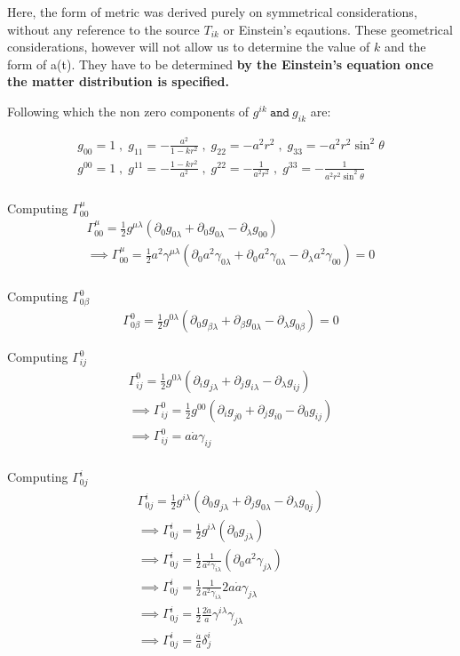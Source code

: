 \documentclass[12pt]{report}
\newcommand{\ch}[2]{\Gamma^{#1}_{#2}}
\newcommand{\p}{\partial}
\newcommand{\cbox}{tcolorbox}
\begin{document}
\begin{\cbox}
Here, the form of metric was derived purely on symmetrical considerations, without any reference to the source $T_{ik}$ or Einstein's eqautions. These geometrical considerations, however will not allow us to determine the value of $k$ and the form of a(t). They have to be determined \textbf{by the Einstein's equation once the matter distribution is specified.}
\end{\cbox}


 Following which the non zero components of $g^{ik} \: \mathtt{and} \: g_{ik}$  are:

\begin{eqnarray*}
g_{00}=1 \; , \; g_{11}=-\frac{a^2}{1-kr^2} \; , \; g_{22}= -a^2r^2 \; , \; g_{33}=-a^2r^2 \sin^2 \theta \\
g^{00}=1 \; , \; g^{11}= - \frac{1-kr^2}{a^2} \; , \; g^{22}= -  \frac{1}{a^2r^2} \; , \; g^{33}= - \frac{1}{a^2r^2 \sin^2 \theta}  \\
\end{eqnarray*}

Computing $\ch{\mu}{0 0}$
\begin{eqnarray*}
\ch{\mu}{00}=\frac{1}{2}g^{\mu \lambda}(\p_{0} g_{0 \lambda}+\p_0 g_{0 \lambda} - \p_\lambda g_{0 0})\\
\implies \ch{\mu}{00}=\frac{1}{2}a^2\gamma^{\mu \lambda}(\p_{0} a^2\gamma_{0 \lambda}+\p_0 a^2\gamma_{0 \lambda} - \p_\lambda a^2\gamma_{0 0}) = 0\\
\end{eqnarray*}

Computing $\ch{0}{0 \beta}$
\begin{eqnarray*}
\ch{0}{0 \beta}=\frac{1}{2}g^{0 \lambda}(\p_{0} g_{\beta \lambda}+\p_\beta g_{0 \lambda} - \p_\lambda g_{0 \beta})=0
\end{eqnarray*}

Computing $\ch{0}{ij}$
\begin{eqnarray*}
\ch{0}{ij}=\frac{1}{2}g^{0 \lambda}(\p_{i} g_{j \lambda}+\p_j g_{i \lambda} - \p_\lambda g_{ij})\\
\implies \ch{0}{ij}=\frac{1}{2}g^{0 0}(\p_{i} g_{j 0}+\p_j g_{i 0} - \p_0 g_{ij})\\
\implies \ch{0}{ij}=a \dot{a} \gamma_{ij}\\
\end{eqnarray*}

Computing $\ch{i}{0j}$
\begin{eqnarray*}
\ch{i}{0 j}=\frac{1}{2}g^{i \lambda}(\p_{0} g_{j \lambda}+\p_j g_{0 \lambda} - \p_\lambda g_{0j})\\
\implies \ch{i}{0 j}=\frac{1}{2}g^{i \lambda}(\p_{0} g_{j \lambda})\\
\implies \ch{i}{0 j}=\frac{1}{2}  \frac{1}{a^2 \gamma_{i \lambda}}(\p_{0}  a^2 \gamma_{j \lambda})\\
\implies \ch{i}{0 j}=\frac{1}{2}  \frac{1}{a^2 \gamma_{i \lambda}} 2a \dot{a} \gamma_{j \lambda}\\
\implies \ch{i}{0 j}=\frac{1}{2}  \frac{2 \dot{a}}{a } \gamma^{i \lambda}  \gamma_{j \lambda}\\
\implies \ch{i}{0 j}=  \frac{\dot{a}}{a } \delta^i_j
\end{eqnarray*}
\end{document}
